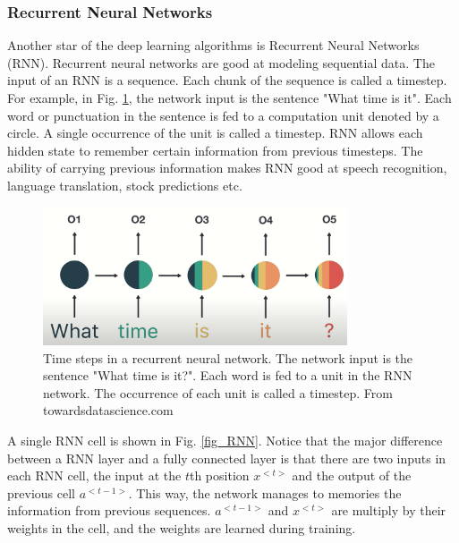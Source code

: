 \subsubsection{Recurrent Neural Networks}
Another star of the deep learning algorithms is Recurrent Neural Networks (RNN). Recurrent neural networks are good at modeling sequential data. The input of an RNN is a sequence. Each chunk of the sequence is called a timestep. For example, in Fig. \ref{fig_RNN_timestep}, the network input is the sentence "What time is it". Each word or punctuation in the sentence is fed to a computation unit denoted by a circle. A single occurrence of the unit is called a timestep. RNN allows each hidden state to remember certain information from previous timesteps. The ability of carrying previous information makes RNN good at speech recognition, language translation, stock predictions etc. 
\begin{figure}[h!]
\begin{center}
\includegraphics[width = 9cm]{img/RNN.png}
\caption[Time steps in a recurrent neural network]{Time steps in a recurrent neural network. The network input is the sentence "What time is it?". Each word is fed to a unit in the RNN network. The occurrence of each unit is called a timestep. From towardsdatascience.com \label{fig_RNN_timestep}}
\end{center}
\end{figure}

 A single RNN cell is shown in Fig. \ref{fig_RNN}. Notice that the major difference between a RNN layer and a fully connected layer is that there are two inputs in each RNN cell, the input at the $t$th position $x^{<t>}$ and the output of the previous cell $a^{<t-1>}$. This way, the network manages to memories the information from previous sequences. $a^{<t-1>}$ and $x^{<t>}$ are multiply by their weights in the cell, and the weights are learned during training. 

